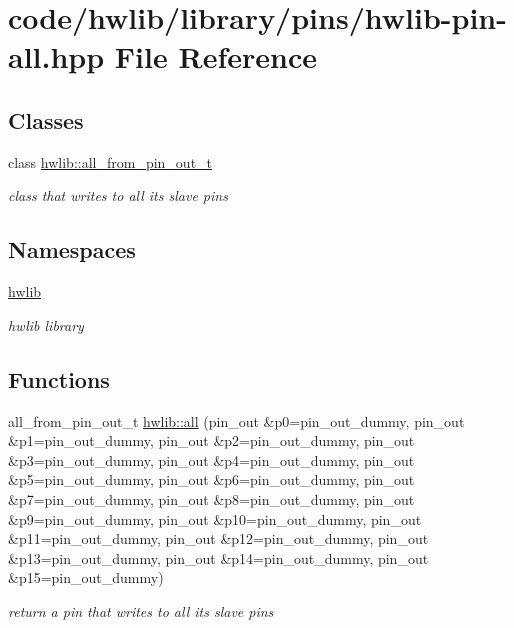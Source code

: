 \hypertarget{hwlib-pin-all_8hpp}{}\section{code/hwlib/library/pins/hwlib-\/pin-\/all.hpp File Reference}
\label{hwlib-pin-all_8hpp}
\subsection*{Classes}
\begin{DoxyCompactItemize}
\item 
class \hyperlink{classhwlib_1_1all__from__pin__out__t}{hwlib\+::all\+\_\+from\+\_\+pin\+\_\+out\+\_\+t}
\begin{DoxyCompactList}\small\item\em class that writes to all its slave pins \end{DoxyCompactList}\end{DoxyCompactItemize}
\subsection*{Namespaces}
\begin{DoxyCompactItemize}
\item 
 \hyperlink{namespacehwlib}{hwlib}
\begin{DoxyCompactList}\small\item\em hwlib library \end{DoxyCompactList}\end{DoxyCompactItemize}
\subsection*{Functions}
\begin{DoxyCompactItemize}
\item 
\mbox{\label{namespacehwlib_ae9782ffebd06ef5e27b19e0e1831ad5e}} 
all\+\_\+from\+\_\+pin\+\_\+out\+\_\+t \hyperlink{namespacehwlib_ae9782ffebd06ef5e27b19e0e1831ad5e}{hwlib\+::all} (pin\+\_\+out \&p0=pin\+\_\+out\+\_\+dummy, pin\+\_\+out \&p1=pin\+\_\+out\+\_\+dummy, pin\+\_\+out \&p2=pin\+\_\+out\+\_\+dummy, pin\+\_\+out \&p3=pin\+\_\+out\+\_\+dummy, pin\+\_\+out \&p4=pin\+\_\+out\+\_\+dummy, pin\+\_\+out \&p5=pin\+\_\+out\+\_\+dummy, pin\+\_\+out \&p6=pin\+\_\+out\+\_\+dummy, pin\+\_\+out \&p7=pin\+\_\+out\+\_\+dummy, pin\+\_\+out \&p8=pin\+\_\+out\+\_\+dummy, pin\+\_\+out \&p9=pin\+\_\+out\+\_\+dummy, pin\+\_\+out \&p10=pin\+\_\+out\+\_\+dummy, pin\+\_\+out \&p11=pin\+\_\+out\+\_\+dummy, pin\+\_\+out \&p12=pin\+\_\+out\+\_\+dummy, pin\+\_\+out \&p13=pin\+\_\+out\+\_\+dummy, pin\+\_\+out \&p14=pin\+\_\+out\+\_\+dummy, pin\+\_\+out \&p15=pin\+\_\+out\+\_\+dummy)
\begin{DoxyCompactList}\small\item\em return a pin that writes to all its slave pins \end{DoxyCompactList}\end{DoxyCompactItemize}

